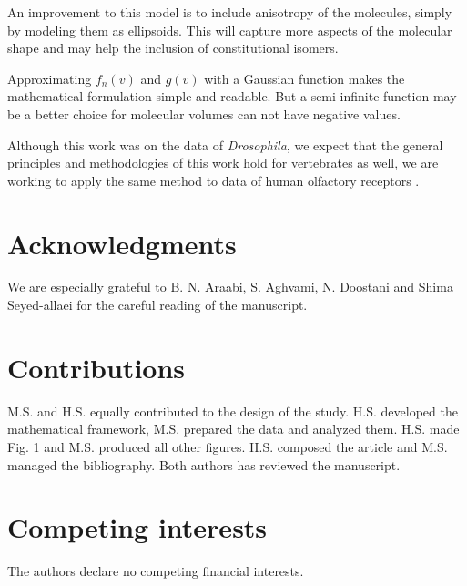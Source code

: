 \documentclass[fleqn,11pt]{wlscirep}
\begin{document}
An improvement to this model is to include anisotropy of the molecules, 
simply by modeling  them as ellipsoids. 
This will capture more aspects of the molecular shape and may help the inclusion of constitutional isomers. 

Approximating $f_n(v)$ and $g(v)$ with a Gaussian function makes the mathematical formulation simple and readable. 
But a semi-infinite function may be a better choice for molecular volumes can not have negative values.

Although this work was on the data of \textit{Drosophila}, 
we expect that the general principles and methodologies of this work hold for vertebrates as well, 
we are working to apply the same method to data of human olfactory receptors \cite{mainland2015human}.


\section*{Acknowledgments}
We are especially grateful to B. N. Araabi, S. Aghvami, N. Doostani and Shima Seyed-allaei for the careful reading of the manuscript.




\section*{Contributions}

M.S. and H.S. equally contributed to the design of the study. H.S. developed the mathematical framework, M.S. prepared the data and analyzed them. H.S. made Fig. 1 and M.S. produced all other figures. H.S. composed the article and M.S. managed the bibliography. Both authors has reviewed the manuscript.

\section*{Competing interests}
The authors declare no competing financial interests.
\end{document}
